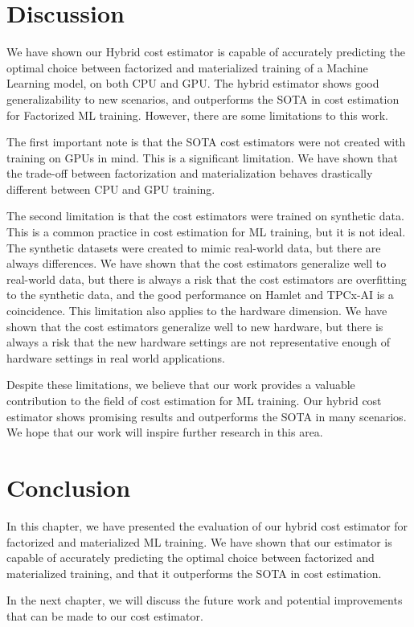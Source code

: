 \section{Discussion}
\label{sec:eval-discussion}
We have shown our Hybrid cost estimator is capable of accurately predicting the optimal choice between factorized and materialized training of a Machine Learning model, on both CPU and GPU. The hybrid estimator shows good generalizability to new scenarios, and outperforms the SOTA in cost estimation for Factorized ML training. However, there are some limitations to this work.

The first important note is that the SOTA cost estimators were not created with training on GPUs in mind. This is a significant limitation. We have shown that the trade-off between factorization and materialization behaves drastically different between CPU and GPU training.

The second limitation is that the cost estimators were trained on synthetic data. This is a common practice in cost estimation for ML training, but it is not ideal. The synthetic datasets were created to mimic real-world data, but there are always differences. We have shown that the cost estimators generalize well to real-world data, but there is always a risk that the cost estimators are overfitting to the synthetic data, and the good performance on Hamlet and TPCx-AI is a coincidence. This limitation also applies to the hardware dimension. We have shown that the cost estimators generalize well to new hardware, but there is always a risk that the new hardware settings are not representative enough of hardware settings in real world applications.

Despite these limitations, we believe that our work provides a valuable contribution to the field of cost estimation for ML training. Our hybrid cost estimator shows promising results and outperforms the SOTA in many scenarios. We hope that our work will inspire further research in this area.

\section{Conclusion}
\label{sec:eval-conclusion}

In this chapter, we have presented the evaluation of our hybrid cost estimator for factorized and materialized ML training. We have shown that our estimator is capable of accurately predicting the optimal choice between factorized and materialized training, and that it outperforms the SOTA in cost estimation.

In the next chapter, we will discuss the future work and potential improvements that can be made to our cost estimator.

